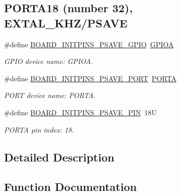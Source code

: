 \subsection*{P\+O\+R\+T\+A18 (number 32), E\+X\+T\+A\+L\+\_\+K\+H\+Z/\+P\+S\+A\+VE}
\begin{DoxyCompactItemize}
\item 
\mbox{\label{group__pin__mux_ga7aa5a422cb5ccede7a0bb7e40d90409e}} 
\#define \mbox{\hyperlink{group__pin__mux_ga7aa5a422cb5ccede7a0bb7e40d90409e}{B\+O\+A\+R\+D\+\_\+\+I\+N\+I\+T\+P\+I\+N\+S\+\_\+\+P\+S\+A\+V\+E\+\_\+\+G\+P\+IO}}~\mbox{\hyperlink{group___g_p_i_o___peripheral___access___layer_gac485358099728ddae050db37924dd6b7}{G\+P\+I\+OA}}
\begin{DoxyCompactList}\small\item\em G\+P\+IO device name\+: G\+P\+I\+OA. \end{DoxyCompactList}\item 
\mbox{\label{group__pin__mux_gad3115cc1109f83acf51d829024e437d6}} 
\#define \mbox{\hyperlink{group__pin__mux_gad3115cc1109f83acf51d829024e437d6}{B\+O\+A\+R\+D\+\_\+\+I\+N\+I\+T\+P\+I\+N\+S\+\_\+\+P\+S\+A\+V\+E\+\_\+\+P\+O\+RT}}~\mbox{\hyperlink{group___p_o_r_t___peripheral___access___layer_ga7c8a7f98a98d8cb125dd57a66720ab30}{P\+O\+R\+TA}}
\begin{DoxyCompactList}\small\item\em P\+O\+RT device name\+: P\+O\+R\+TA. \end{DoxyCompactList}\item 
\mbox{\label{group__pin__mux_ga3c7d83caf513a615a6e244229a40fd8a}} 
\#define \mbox{\hyperlink{group__pin__mux_ga3c7d83caf513a615a6e244229a40fd8a}{B\+O\+A\+R\+D\+\_\+\+I\+N\+I\+T\+P\+I\+N\+S\+\_\+\+P\+S\+A\+V\+E\+\_\+\+P\+IN}}~18U
\begin{DoxyCompactList}\small\item\em P\+O\+R\+TA pin index\+: 18. \end{DoxyCompactList}\end{DoxyCompactItemize}


\subsection{Detailed Description}


\subsection{Function Documentation}
\mbox{\label{group__pin__mux_ga18145d0a226cc9ba105372695e8ade79}} 
